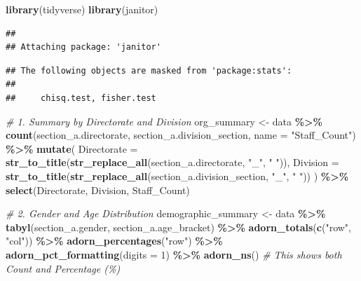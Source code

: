 \documentclass[
]{article}
\newenvironment{Shaded}{\begin{snugshade}}{\end{snugshade}}
\newcommand{\AttributeTok}[1]{\textcolor[rgb]{0.13,0.29,0.53}{#1}}
\newcommand{\CommentTok}[1]{\textcolor[rgb]{0.56,0.35,0.01}{\textit{#1}}}
\newcommand{\DecValTok}[1]{\textcolor[rgb]{0.00,0.00,0.81}{#1}}
\newcommand{\FunctionTok}[1]{\textcolor[rgb]{0.13,0.29,0.53}{\textbf{#1}}}
\newcommand{\NormalTok}[1]{#1}
\newcommand{\OtherTok}[1]{\textcolor[rgb]{0.56,0.35,0.01}{#1}}
\newcommand{\SpecialCharTok}[1]{\textcolor[rgb]{0.81,0.36,0.00}{\textbf{#1}}}
\newcommand{\StringTok}[1]{\textcolor[rgb]{0.31,0.60,0.02}{#1}}
\begin{document}
\begin{Shaded}
\begin{Highlighting}[]
\FunctionTok{library}\NormalTok{(tidyverse)}
\FunctionTok{library}\NormalTok{(janitor)}
\end{Highlighting}
\end{Shaded}

\begin{verbatim}
## 
## Attaching package: 'janitor'
\end{verbatim}

\begin{verbatim}
## The following objects are masked from 'package:stats':
## 
##     chisq.test, fisher.test
\end{verbatim}

\begin{Shaded}
\begin{Highlighting}[]
\CommentTok{\# 1. Summary by Directorate and Division}
\NormalTok{org\_summary }\OtherTok{\textless{}{-}}\NormalTok{ data }\SpecialCharTok{\%\textgreater{}\%}
  \FunctionTok{count}\NormalTok{(section\_a.directorate, section\_a.division\_section, }\AttributeTok{name =} \StringTok{"Staff\_Count"}\NormalTok{) }\SpecialCharTok{\%\textgreater{}\%}
  \FunctionTok{mutate}\NormalTok{(}
    \AttributeTok{Directorate =} \FunctionTok{str\_to\_title}\NormalTok{(}\FunctionTok{str\_replace\_all}\NormalTok{(section\_a.directorate, }\StringTok{"\_"}\NormalTok{, }\StringTok{" "}\NormalTok{)),}
    \AttributeTok{Division =} \FunctionTok{str\_to\_title}\NormalTok{(}\FunctionTok{str\_replace\_all}\NormalTok{(section\_a.division\_section, }\StringTok{"\_"}\NormalTok{, }\StringTok{" "}\NormalTok{))}
\NormalTok{  ) }\SpecialCharTok{\%\textgreater{}\%}
  \FunctionTok{select}\NormalTok{(Directorate, Division, Staff\_Count)}

\CommentTok{\# 2. Gender and Age Distribution}
\NormalTok{demographic\_summary }\OtherTok{\textless{}{-}}\NormalTok{ data }\SpecialCharTok{\%\textgreater{}\%}
  \FunctionTok{tabyl}\NormalTok{(section\_a.gender, section\_a.age\_bracket) }\SpecialCharTok{\%\textgreater{}\%}
  \FunctionTok{adorn\_totals}\NormalTok{(}\FunctionTok{c}\NormalTok{(}\StringTok{"row"}\NormalTok{, }\StringTok{"col"}\NormalTok{)) }\SpecialCharTok{\%\textgreater{}\%}
  \FunctionTok{adorn\_percentages}\NormalTok{(}\StringTok{"row"}\NormalTok{) }\SpecialCharTok{\%\textgreater{}\%}
  \FunctionTok{adorn\_pct\_formatting}\NormalTok{(}\AttributeTok{digits =} \DecValTok{1}\NormalTok{) }\SpecialCharTok{\%\textgreater{}\%}
  \FunctionTok{adorn\_ns}\NormalTok{() }\CommentTok{\# This shows both Count and Percentage (\%)}


\end{Highlighting}
\end{Shaded}
\end{document}
